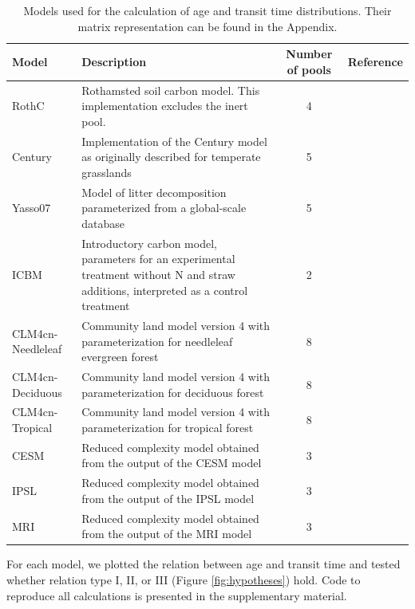 \documentclass[draft,linenumbers]{agujournal}
\begin{document}
\begin{table}[htbp]
   \centering
   \caption{Models used for the calculation of age and transit time distributions. Their matrix representation can be found in the Appendix.} \label{tab:models}
   \begin{tabular}{lp{5cm}cp{2cm}} %
      \toprule
      Model    & Description & Number of pools & Reference \\
      \midrule
      RothC      & Rothamsted soil carbon model. This implementation excludes the inert pool. & 4 & \citet{Jenkinson1990} \\
      Century & Implementation of the Century model as originally described for temperate grasslands & 5 & \citet{Parton1987}  \\ 
      Yasso07 & Model of litter decomposition parameterized from a global-scale database & 5 & \citet{Tuomi2009}  \\ 
      ICBM & Introductory carbon model, parameters for an experimental treatment without N and straw additions, interpreted as a control treatment & 2 & \citet{Andren1997}  \\ 
      CLM4cn-Needleleaf & Community land model version 4 with parameterization for needleleaf evergreen forest & 8 & \citet{Wieder2014}  \\ 
      CLM4cn-Deciduous & Community land model version 4 with parameterization for deciduous forest & 8 & \citet{Wieder2014}  \\ 
      CLM4cn-Tropical & Community land model version 4 with parameterization for tropical forest & 8 & \citet{Wieder2014}  \\ 
      CESM & Reduced complexity model obtained from the output of the CESM model & 3 & \citet{He2016}  \\ 
      IPSL & Reduced complexity model obtained from the output of the IPSL model & 3 & \citet{He2016}  \\ 
      MRI & Reduced complexity model obtained from the output of the MRI model & 3 & \citet{He2016}  \\ 
      \bottomrule
   \end{tabular}
\end{table}

For each model, we plotted the relation between age and transit time and tested whether relation type I, II, or III (Figure \ref{fig:hypotheses}) hold. Code to reproduce all calculations is presented in the supplementary material. 
\end{document}
